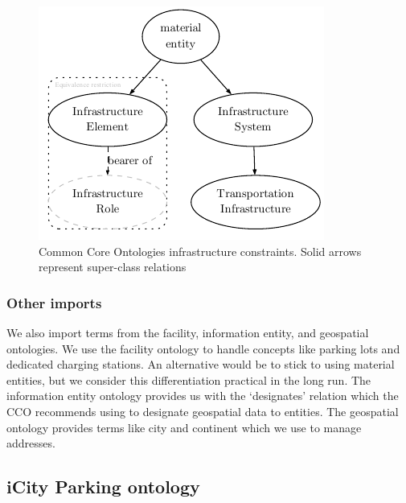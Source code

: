 \begin{figure}[h]
    \centering
    \includegraphics{images/infrastructureSystem.pdf}
    \caption{Common Core Ontologies infrastructure constraints. Solid arrows represent super-class relations}
    \label{infrastructurefigs} 
\end{figure}

\subsubsection{Other imports}

We also import terms from the facility, information entity, and geospatial
ontologies. We use the facility ontology to handle concepts like parking lots
and dedicated charging stations. An alternative would be to stick to using
material entities, but we consider this differentiation practical in the long
run. The information entity ontology provides us with the `designates' relation
which the CCO recommends using to designate geospatial data to entities. The
geospatial ontology provides terms like city and continent which we use to
manage addresses.


\subsection{iCity Parking ontology}

